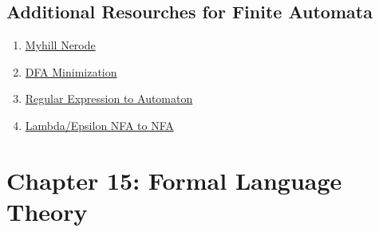 \documentclass{article}
\begin{document}

\subsection*{Additional Resourches for Finite Automata}
\begin{enumerate}
    \item \href{https://www.youtube.com/watch?v=gjDPTy6fwbk}{Myhill Nerode}
    \item \href{https://www.youtube.com/watch?v=7W2lSrt8r-0&t=703s}{DFA Minimization}
    \item \href{https://www.youtube.com/watch?v=VbR1mGdP99s}{Regular Expression to Automaton}
    \item \href{https://www.youtube.com/watch?v=yXLZ9JbvEEg}{Lambda/Epsilon NFA to NFA}
\end{enumerate}
\newpage

\section*{Chapter 15: Formal Language Theory}
\end{document}
